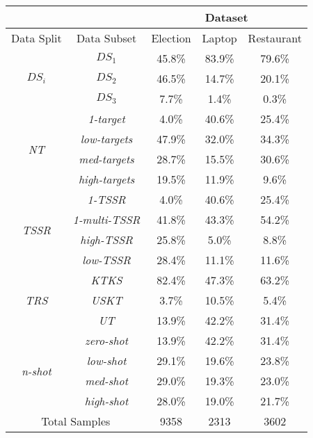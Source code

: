 \begin{tabular}{|c|c|c|c|c|}
\hline
    &    & \multicolumn{3}{c|}{Dataset} \\
\hline
Data Split & Data Subset &  Election &  Laptop &  Restaurant \\
\hline
\multirow{3}{*}{$DS_i$} & $DS_1$ &      45.8\% &    83.9\% &        79.6\% \\
 & $DS_2$ &      46.5\% &    14.7\% &        20.1\% \\
 & $DS_3$ &       7.7\% &     1.4\% &         0.3\% \\
\hline
 \multirow{4}{*}{\textit{NT}} & \textit{1-target} &       4.0\% &    40.6\% &        25.4\% \\
 & \textit{low-targets} &      47.9\% &    32.0\% &        34.3\% \\
 & \textit{med-targets} &      28.7\% &    15.5\% &        30.6\% \\
 & \textit{high-targets} &      19.5\% &    11.9\% &         9.6\% \\
\hline
 \multirow{4}{*}{\textit{TSSR}} & \textit{1-TSSR} &       4.0\% &    40.6\% &        25.4\% \\
 & \textit{1-multi-TSSR} &      41.8\% &    43.3\% &        54.2\% \\
 & \textit{high-TSSR} &      25.8\% &    5.0\% &         8.8\% \\
 & \textit{low-TSSR} &      28.4\% &    11.1\% &        11.6\% \\
 \hline
 \multirow{3}{*}{\textit{TRS}} & \textit{KTKS} &      82.4\% &    47.3\% &        63.2\% \\
 & \textit{USKT} &       3.7\% &    10.5\% &         5.4\% \\
 & \textit{UT} &      13.9\% &    42.2\% &        31.4\% \\
\hline
 \multirow{4}{*}{\textit{n-shot}} & \textit{zero-shot} &      13.9\% &    42.2\% &        31.4\% \\
 & \textit{low-shot} &      29.1\% &    19.6\% &        23.8\% \\
 & \textit{med-shot} &      29.0\% &    19.3\% &        23.0\% \\
 & \textit{high-shot} &      28.0\% &    19.0\% &        21.7\% \\
\hline
 \multicolumn{2}{|c|}{Total Samples}           &    9358 &  2313 &      3602 \\
\hline
 \end{tabular}